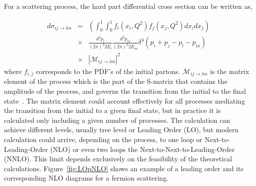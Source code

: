 For a scattering process, the hard part differential cross section can be written as,

\begin{eqnarray}
  \label{eq:DiffXS}
  d\sigma_{ij\rightarrow lm} & = & \left( \int_{0}^{1}\int_{0}^{1}f_{i}(x_{i},Q^{2})f_{j}(x_{j},Q^{2})dx_{i}dx_{j} \right) \nonumber \\  
 & \times & \frac{d^{3}p_{l}}{(2\pi)^{2}2E_{l}}\frac{d^{3}p_{m}}{(2\pi)^{2}2E_{m}}\delta^{4}\left( p_{i}+p_{j}-p_{l}-p_{m} \right) \nonumber \\  
 & \times & |\mathcal{M}_{ij\rightarrow lm}|^{2}
\end{eqnarray} where $f_{i,j}$ corresponds to the PDF's of the initial partons. $\mathcal{M}_{ij\rightarrow lm}$ is the matrix element of the process which is the part of the S-matrix that contains the amplitude of the process, and governs the transition from the initial to the final state~\cite{opac-b1131978}. The matrix element could account effectively for all processes mediating the transition from the initial to a given final state, but in practice it is calculated only including a given number of processes. The calculation can achieve different levels, usually tree level or Leading Order (LO), but modern calculation could arrive, depending on the process, to one loop or Next-to-Leading-Order (NLO) or even two loops the  Next-to-Next-to-Leading-Order (NNLO). This limit depends exclusively on the feasibility of the theoretical calculations. Figure~\ref{fig:LOpNLO} shows an example of a leading order and its corresponding NLO diagrams for a fermion scattering.


